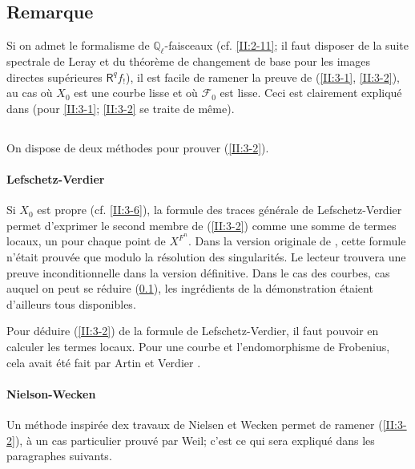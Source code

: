 \documentclass{book}
\newcommand{\cF}{\mathcal{F}}
\newcommand{\dQ}{\mathbb{Q}}
\newcommand{\R}{\mathsf{R}}
\begin{document}
\subsection{Remarque}\label{II:3-7}

Si on admet le formalisme de $\dQ_\ell$-faisceaux (cf. \ref{II:2-11}; il faut 
disposer de la suite spectrale de Leray et du théorème de changement de 
base pour les images directes supérieures $\R^q f_!$), il est facile de 
ramener la preuve de (\ref{II:3-1}, \ref{II:3-2}), au cas où $X_0$ est 
une courbe lisse et où $\cF_0$ est lisse. Ceci est clairement expliqué 
dans \cite[\S 5]{II:2} (pour \ref{II:3-1}; \ref{II:3-2} se traite de même). 





\subsection{}\label{II:3-8}

On dispose de deux méthodes pour prouver (\ref{II:3-2}). 


\paragraph{Lefschetz-Verdier}
Si $X_0$ est propre (cf. \ref{II:3-6}), la formule des traces générale de 
Lefschetz-Verdier permet d'exprimer le second membre de (\ref{II:3-2}) comme 
une somme de termes locaux, un pour chaque point de $X^{F^n}$. Dans la version 
originale de \cite{SGA5}, cette formule n'était prouvée que modulo la 
résolution des singularités. Le lecteur trouvera une preuve inconditionnelle 
dans la version définitive. Dans le cas des courbes, cas auquel on peut se 
réduire (\ref{II:3-7}), les ingrédients de la démonstration étaient 
d'ailleurs tous disponibles. 

Pour déduire (\ref{II:3-2}) de la formule de Lefschetz-Verdier, il faut 
pouvoir en calculer les termes locaux. Pour une courbe et l'endomorphisme de 
Frobenius, cela avait été fait par Artin et Verdier \cite{II:V}. 


\paragraph{Nielson-Wecken}
Un méthode inspirée dex travaux de Nielsen et Wecken permet de ramener 
(\ref{II:3-2}), à un cas particulier prouvé par Weil; c'est ce qui sera 
expliqué dans les paragraphes suivants. 
\end{document}

